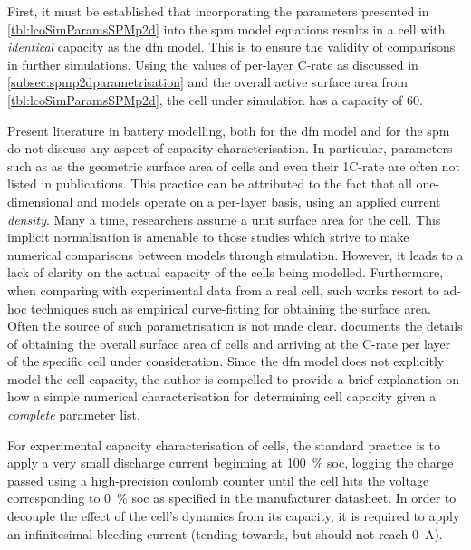 First,  it  must be  established  that  incorporating the  parameters  presented
in \cref{tbl:lcoSimParamsSPMp2d} into the \gls{spm} model equations results in a
cell with  \emph{identical} capacity as the  \gls{dfn} model. This is  to ensure
the  validity  of  comparisons  in  further simulations.  Using  the  values  of
per-layer  C-rate as  discussed  in \cref{subsec:spmp2dparametrisation} and  the
overall active  surface area from \cref{tbl:lcoSimParamsSPMp2d}, the  cell under
simulation has a capacity of \SI{60}{\amphour}.

Present literature  in battery modelling, both  for the \gls{dfn} model  and for
the  \gls{spm}  do not  discuss  any  aspect  of capacity  characterisation.  In
particular, parameters such  as as the geometric surface area  of cells and even
their  1C-rate are  often  not  listed in  publications.  This  practice can  be
attributed  to the  fact that  all one-dimensional  and   models
operate on  a per-layer basis, using  an applied current \emph{density}.  Many a
time,  researchers assume  a  unit  surface area  for  the  cell. This  implicit
normalisation  is amenable  to  those  studies which  strive  to make  numerical
comparisons between  models through simulation. However,  it leads to a  lack of
clarity on  the actual capacity of  the cells being modelled.  Furthermore, when
comparing with experimental  data from a real cell, such  works resort to ad-hoc
techniques such as empirical curve-fitting for obtaining the surface area. Often
the source of such parametrisation is not made clear. 
documents  the details  of  obtaining  the overall  surface  area  of cells  and
arriving at the C-rate per layer of the specific cell under consideration. Since
the \gls{dfn}  model does  not explicitly  model the  cell capacity,  the author
is  compelled  to  provide  a  brief  explanation  on  how  a  simple  numerical
characterisation for determining cell capacity given a \emph{complete} parameter
list. 

For experimental capacity characterisation of cells, the standard practice is to
apply a very small discharge  current beginning at \SI{100}{\percent} \gls{soc},
logging the charge passed using a  high-precision coulomb counter until the cell
hits the voltage corresponding to \SI{0}{\percent} \gls{soc} as specified in the
manufacturer datasheet. In  order to decouple the effect of  the cell's dynamics
from its  capacity, it is  required to  apply an infinitesimal  bleeding current
(tending towards, but should not reach \SI{0}{\ampere}).

